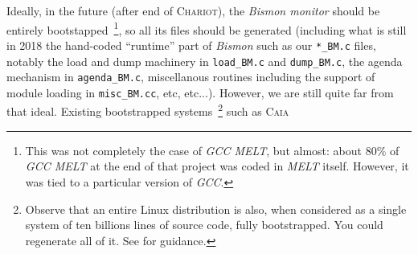 Ideally, in the future (after end of \textsc{Chariot}), the
\emph{Bismon monitor} should be entirely bootstapped~\footnote{This
  was not completely the case of \emph{GCC MELT}, but almost: about
  80\% of \emph{GCC MELT} at the end of that project was coded in
  \emph{MELT} itself. However, it was tied to a particular version of
  \emph{GCC}.}, so all its files should be generated (including what
is still in 2018 the hand-coded ``runtime'' part of \emph{Bismon} such
as our \texttt{*\_BM.c} files, notably the load and dump machinery in
\texttt{load\_BM.c} and \texttt{dump\_BM.c}, the agenda mechanism in
\texttt{agenda\_BM.c}, miscellanous routines including the support of
module loading in \texttt{misc\_BM.cc}, etc, etc...). However, we are
still quite far from that ideal. Existing bootstrapped
 systems~\footnote{Observe that an entire Linux
  distribution is also, when considered as a single system of ten
  billions lines of source code, fully bootstrapped. You could
  regenerate all of it. See 
  for guidance.} such as \textsc{Caia} 
